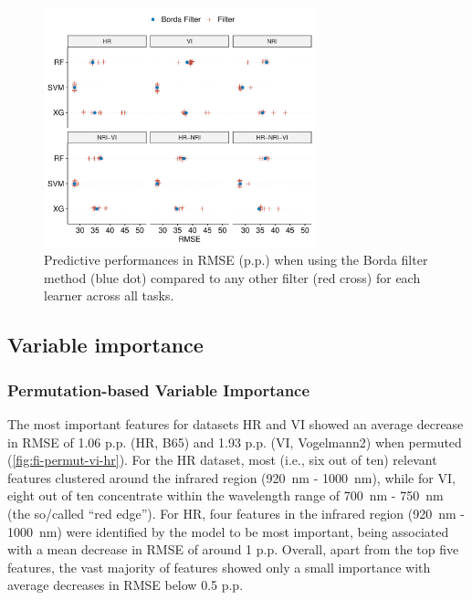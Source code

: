 \documentclass[remotesensing,article,submit,moreauthors,pdftex]{Definitions/mdpi}
\begin{document}
\begin{figure} [t!]
	\centering
	\begin{center}
		\includegraphics[width=0.7\textwidth] {filter-effect-all-vs-borda-filter-1.pdf}
		\caption{Predictive performances in RMSE (p.p.) when using the Borda filter method (blue dot) compared to any other filter (red cross) for each learner across all tasks.}\label{fig:filter-effects-borda}
	\end{center}
\end{figure}

\subsection{Variable importance}

\subsubsection{Permutation-based Variable Importance}


The most important features for datasets HR and VI showed an average decrease in RMSE of 1.06 p.p. (HR, B65) and 1.93 p.p. (VI, Vogelmann2) when permuted (\autoref{fig:fi-permut-vi-hr}).
For the HR dataset, most (i.e., six out of ten) relevant features clustered around the infrared region (920~nm - 1000~nm), while for VI, eight out of ten concentrate within the wavelength range of 700~nm - 750~nm (the so\-/called \enquote{red edge}).
For HR, four features in the infrared region (920~nm - 1000~nm) were identified by the model to be most important, being associated with a mean decrease in RMSE of around 1 p.p.
Overall, apart from the top five features, the vast majority of features showed only a small importance with average decreases in RMSE below 0.5 p.p.
\end{document}
